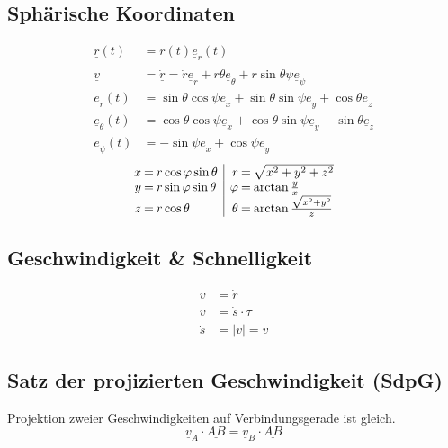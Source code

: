 \documentclass{article}
\begin{document}
\begin{multicols*}{4}
			\subsection{Sphärische Koordinaten} %
				\begin{align*}
					\underline{r}(t) &= r(t) \underline{e}_r(t) \\
					\underline{v} &= \dot{\underline{r}} = \dot{r} \underline{e}_r + r \dot{\theta} \underline{e}_{\theta} + r \sin{\theta} \dot{\psi} \underline{e}_{\psi} \\
					\underline{e}_r (t) &= \sin{\theta} \cos{\psi} \underline{e}_x + \sin{\theta} \sin{\psi} \underline{e}_y + \cos{\theta}\underline{e}_z \\
					\underline{e}_{\theta} (t) &= \cos{\theta} \cos{\psi} \underline{e}_x + \cos{\theta} \sin{\psi} \underline{e}_y - \sin{\theta}\underline{e}_z \\
					\underline{e}_{\psi} (t) &= -\sin{\psi} \underline{e}_x + \cos{\psi} \underline{e}_y
				\end{align*}
				\[
					\begin{array}{r@{\:=\:}l|r@{\:=\:}l}
						x & r \cos{\varphi} \sin{\theta} & r & \sqrt{x^2 + y^2 + z^2} \\
						y & r \sin{\varphi} \sin{\theta} & \varphi & \arctan{\frac{y}{x}} \\
						z & r \cos{\theta} & \theta & \arctan{\frac{\sqrt{x^2 + y^2}}{z}}
					\end{array}
				\]
			\subsection{Geschwindigkeit \& Schnelligkeit} %
				\begin{align*}
					\underline{v} &= \dot{\underline{r}}\\
					\underline{v} &= \dot{s}\cdot\underline{\tau}\\
					\dot{s} &= |\underline{v}| = v
				\end{align*}
			\subsection{Satz der projizierten Geschwindigkeit (SdpG)} %
				Projektion zweier Geschwindigkeiten auf Verbindungsgerade ist gleich.
				\[
					\underline{v}_A \cdot \underline{AB} = \underline{v}_B \cdot \underline{AB}
				\]

\end{multicols*}
\end{document}
